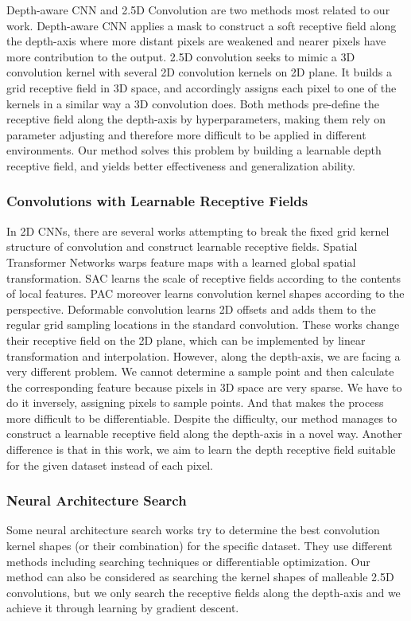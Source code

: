 \documentclass[runningheads]{llncs}
\begin{document}
Depth-aware CNN\cite{DepthAware} and 2.5D Convolution\cite{2_5D} are two methods most related to our work.
Depth-aware CNN applies a mask to construct a soft receptive field along the depth-axis where more distant pixels are weakened and nearer pixels have more contribution to the output.
2.5D convolution seeks to mimic a 3D convolution kernel with several 2D convolution kernels on 2D plane.
It builds a grid receptive field in 3D space, and accordingly assigns each pixel to one of the kernels in a similar way a 3D convolution does.
Both methods pre-define the receptive field along the depth-axis by hyperparameters, making them rely on parameter adjusting and therefore more difficult to be applied in different environments.
Our method solves this problem by building a learnable depth receptive field, and yields better effectiveness and generalization ability.

\subsubsection{Convolutions with Learnable Receptive Fields}
In 2D CNNs, there are several works attempting to break the fixed grid kernel structure of convolution and construct learnable receptive fields.
Spatial Transformer Networks\cite{nips15-STN} warps feature maps with a learned global spatial transformation.
SAC\cite{SAC} learns the scale of receptive fields according to the contents of local features.
PAC\cite{TPAMI2020-ZhangTZLY20} moreover learns convolution kernel shapes according to the perspective.
Deformable convolution\cite{cvpr2017-Deformable,cvpr2019-Deformablev2} learns 2D offsets and adds them to the regular grid sampling locations in the standard convolution.
These works change their receptive field on the 2D plane, which can be implemented by linear transformation and interpolation.
However, along the depth-axis, we are facing a very different problem.
We cannot determine a sample point and then calculate the corresponding feature because pixels in 3D space are very sparse.
We have to do it inversely, assigning pixels to sample points.
And that makes the process more difficult to be differentiable.
Despite the difficulty, our method manages to construct a learnable receptive field along the depth-axis in a novel way.
Another difference is that in this work, we aim to learn the depth receptive field suitable for the given dataset instead of each pixel.

\subsubsection{Neural Architecture Search}
Some neural architecture search works\cite{nips2018-DPC,iclr2019-DARTS,iclr2019-SNAS,MixConv} try to determine the best convolution kernel shapes (or their combination) for the specific dataset.
They use different methods including searching techniques or differentiable optimization.
Our method can also be considered as searching the kernel shapes of malleable 2.5D convolutions, but we only search the receptive fields along the depth-axis and we achieve it through learning by gradient descent.
\end{document}
